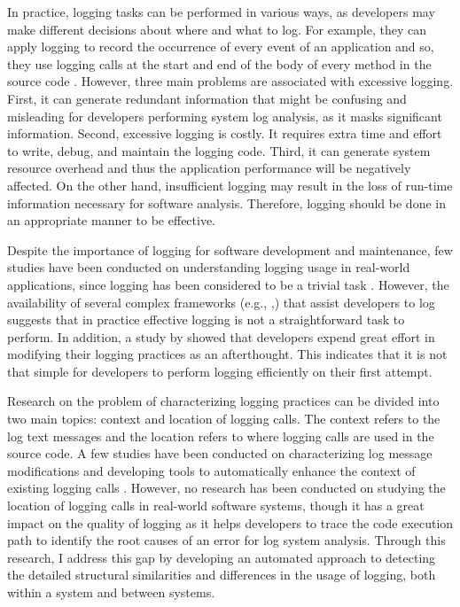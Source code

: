 In practice, logging tasks can be performed in various ways, as developers may make different decisions about where and what to log. For example, they can apply logging to record the occurrence of every event of an application and so, they use logging calls at the start and end of the body of every method in the source code \cite{clarke1999dimension,clarke1999subject}. However, three main problems are associated with excessive logging. First, it can generate redundant information that might be confusing and misleading for developers performing system log analysis, as it masks significant information. Second, excessive logging is costly. It requires extra time and effort to write, debug, and maintain the logging code. Third, it can generate system resource overhead and thus the application performance will be negatively affected. On the other hand, insufficient logging may result in the loss of run-time information necessary for software analysis. Therefore, logging should be done in an appropriate manner to be effective.

Despite the importance of logging for software development and maintenance, few studies have been conducted on understanding logging usage in real-world applications, since logging has been considered to be a trivial task \cite{clarke1999dimension,clarke1999subject}. However, the availability of several complex frameworks (e.g., ,) that assist developers to log suggests that in practice effective logging is not a straightforward task to perform. In addition, a study by \citet{yuan2012characterizing} showed that developers expend great effort in modifying their logging practices as an afterthought. This indicates that it is not that simple for developers to perform logging efficiently on their first attempt.

Research on the problem of characterizing logging practices can be divided into two main topics: context and location of logging calls. The context refers to the log text messages and the location refers to where logging calls are used in the source code. A few studies have been conducted on characterizing log message modifications \cite{yuan2012characterizing} and developing tools to automatically enhance the context of existing logging calls \cite{yuan2012improving, yuan2010sherlog}. However, no research has been conducted on studying the location of logging calls in real-world software systems, though it has a great impact on the quality of logging as it helps developers to trace the code execution path to identify the root causes of an error for log system analysis. Through this research, I address this gap by developing an automated approach to detecting the detailed structural similarities and differences in the usage of logging, both within a system and between systems.


